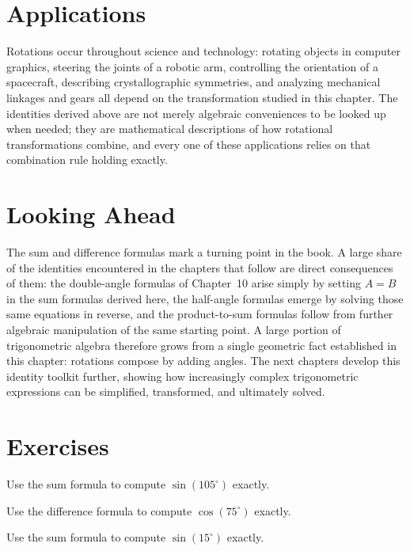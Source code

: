 \section{Applications}

Rotations occur throughout science and technology: rotating objects in
computer graphics, steering the joints of a robotic arm, controlling the
orientation of a spacecraft, describing crystallographic symmetries, and
analyzing mechanical linkages and gears all depend on the transformation
studied in this chapter. The identities derived above are not merely
algebraic conveniences to be looked up when needed; they are mathematical
descriptions of how rotational transformations combine, and every one of
these applications relies on that combination rule holding exactly.

\section{Looking Ahead}

The sum and difference formulas mark a turning point in the book. A large
share of the identities encountered in the chapters that follow are direct
consequences of them: the double-angle formulas of Chapter~10 arise simply
by setting $A = B$ in the sum formulas derived here, the half-angle
formulas emerge by solving those same equations in reverse, and the
product-to-sum formulas follow from further algebraic manipulation of the
same starting point. A large portion of trigonometric algebra therefore
grows from a single geometric fact established in this chapter: rotations
compose by adding angles. The next chapters develop this identity toolkit
further, showing how increasingly complex trigonometric expressions can be
simplified, transformed, and ultimately solved.

\section{Exercises}
\begin{exercise}
Use the sum formula to compute $\sin(105^\circ)$ exactly.
\end{exercise}

\begin{exercise}
Use the difference formula to compute $\cos(75^\circ)$ exactly.
\end{exercise}

\begin{exercise}
Use the sum formula to compute $\sin(15^\circ)$ exactly.
\end{exercise}

